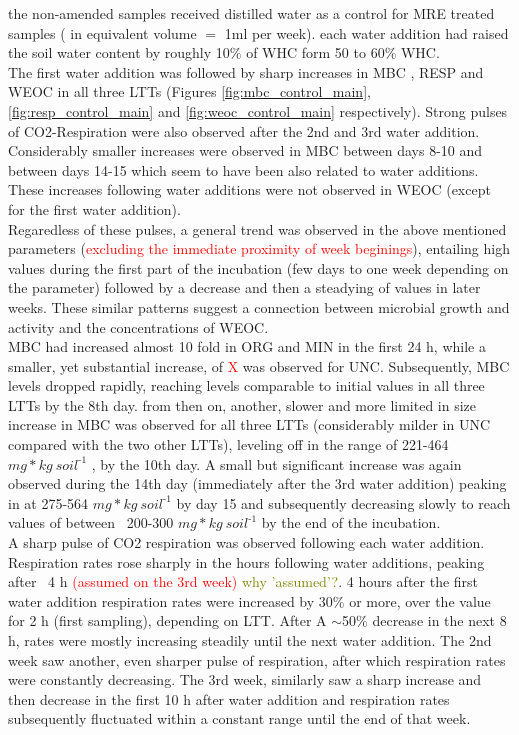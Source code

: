\documentclass[12pt]{report}
\newcommand{\myRed}[1]{\textcolor{red}{#1}} %
\newcommand{\myGreen}[1]{\textcolor{olive}{#1}} %
\newlength{\SpaceAfterUnit}
\newcommand{\genericunit}{$ mg * kg\ soil^{\text{-}1}$ \hspace*{\SpaceAfterUnit}}
\begin{document}
		the non-amended samples received distilled water as a control for MRE treated samples ( in equivalent volume $=$ 1ml per week).
		each water addition had raised the soil water content by roughly  10$\%$ of WHC form 50 to 60$\%$ WHC.\\
		The first water addition was followed by sharp increases in MBC , RESP and  WEOC in all three LTTs (Figures \ref{fig:mbc_control_main}, \ref{fig:resp_control_main} and \ref{fig:weoc_control_main} respectively). Strong pulses of CO2-Respiration were also observed after the 2nd and 3rd water addition. Considerably smaller increases were observed in MBC between days 8-10 and between days 14-15 which seem to have been also related to water additions. These increases following water additions were not observed in WEOC (except for the first water addition). \\
		Regaredless of these pulses, a general trend was observed in the above mentioned parameters (\myRed{excluding the immediate proximity of week beginings}), entailing high values during the first part of the incubation (few days to one week depending on the parameter) followed by a decrease and then a steadying of values in later weeks. These similar patterns suggest a connection between microbial growth and activity and the concentrations of WEOC. \\
		MBC had increased almost 10 fold in ORG and MIN in the first 24 h, while a smaller, yet substantial increase, of \myRed{X} was observed for UNC. Subsequently, MBC levels dropped rapidly, reaching levels comparable to initial values in all three LTTs by the 8th day. from then on, another, slower and more limited in size increase in MBC was observed for all three LTTs (considerably milder in UNC compared with the two other LTTs), leveling off in the range of 221-464 \genericunit, by the 10th day. A small but significant increase was again observed during the 14th day (immediately after the 3rd water addition) peaking in at 275-564 \genericunit by day 15 and subsequently decreasing slowly to reach values of between ~200-300 \genericunit by the end of the incubation.\\
		A sharp pulse of CO2 respiration was observed following each water addition. Respiration rates rose sharply in the hours following water additions, peaking after ~4 h \myRed{(assumed on the 3rd week)} \myGreen{why 'assumed'?}. 4 hours after the first water addition respiration rates were increased by 30$\%$ or more, over the value for 2 h (first sampling), depending on LTT. After A $ \sim $50$\%$ decrease in the next 8 h, rates were mostly  increasing  steadily until the next water addition. The 2nd week saw another, even sharper pulse of respiration, after which respiration rates were constantly decreasing. The 3rd week, similarly saw a sharp increase and then decrease in the first 10 h after water addition and respiration rates subsequently fluctuated within a constant range until the end of that week. 
\end{document}
